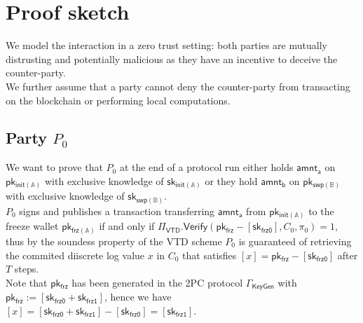 \documentclass{article}      	%
\begin{document}
\section{Proof sketch}


We model the interaction in a zero trust setting: both parties are mutually distrusting and potentially malicious as they have an incentive to deceive the counter-party. \\
We further assume that a party cannot deny the counter-party from transacting on the blockchain or performing local computations.


\subsection{Party $P_0$}
We want to prove that $P_0$ at the end of a protocol run either holds $\mathsf{amnt_a}$ on $\mathsf{pk_{init(\mathbb{A})}}$ with exclusive knowledge of $\mathsf{sk_{init(\mathbb{A})}}$ or they hold $\mathsf{amnt_b}$ on $\mathsf{pk_{swp(\mathbb{B})}}$ with exclusive knowledge of $\mathsf{sk_{swp(\mathbb{B})}}$. \\


$P_0$ signs and publishes a transaction transferring $\mathsf{amnt_a}$ from $\mathsf{pk_{init(\mathbb{A})}}$ to the freeze wallet $\mathsf{pk_{frz(\mathbb{A})}}$ if and only if $\Pi_{\mathsf{VTD}}.\mathsf{Verify}(\mathsf{pk_{frz}} - [\mathsf{sk_{frz0}}], C_0, \pi_0) = 1$, thus by the soundess property of the VTD scheme $P_0$ is guaranteed of retrieving the commited diiscrete log value $x$ in $C_0$ that satisfies $[x] =  \mathsf{pk_{frz}} - [\mathsf{sk_{frz0}}]$ after $T$ steps. \\
Note that $\mathsf{pk_{frz}}$ has been generated in the 2PC protocol $\Gamma_{\mathsf{KeyGen}}$ with $\mathsf{pk_{frz}} := [\mathsf{sk_{frz0}} + \mathsf{sk_{frz1}}]$, hence we have $[x] = [\mathsf{sk_{frz0}} + \mathsf{sk_{frz1}}] - [\mathsf{sk_{frz0}}] = [\mathsf{sk_{frz1}}]$. \\
\end{document}
